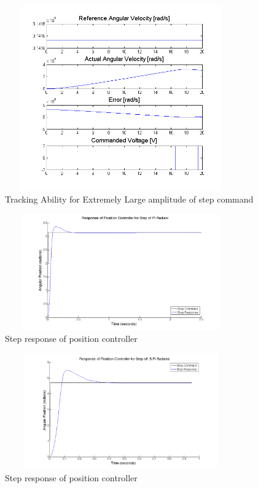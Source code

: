 \documentclass[letterpaper]{article}
\begin{document}
\begin{figure}[H]
\begin{center}
\includegraphics[width = 10cm, height = 8cm]{q5b.png}
\caption{Tracking Ability for Extremely Large amplitude of step command}
\label{q5_b0}
\end{center}
\end{figure}
\begin{figure}[H]
\begin{center}
\includegraphics[width = 10cm, height = 5cm]{posstep_1pi.png}
\caption{Step response of position controller}
\label{q5_b1}
\end{center}
\end{figure}

\begin{figure}[H]
\begin{center}
\includegraphics[width = 10cm, height = 5cm]{posstep_15pi.png}
\caption{Step response of position controller}
\label{q5_b2}
\end{center}
\end{figure}
\end{document}
